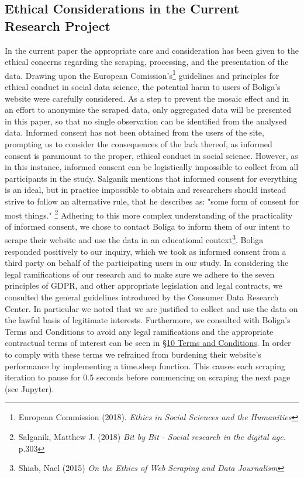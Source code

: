 \documentclass[12pt,a4paper]{article}
\begin{document}
\subsection{Ethical Considerations in the Current Research Project}
In the current paper the appropriate care and consideration has been given to the ethical concerns regarding the scraping, processing, and the presentation of the data. Drawing upon the European Comission's\footnote{European Commission (2018). \textit{Ethics in Social Sciences and the Humanities}} guidelines and principles for ethical conduct in social data science, the potential harm to users of Boliga's website were carefully considered. As a step to prevent the mosaic effect and in an effort to anonymise the scraped data, only aggregated data will be presented in this paper, so that no single observation can be identified from the analysed data.\newline
Informed consent has not been obtained from the users of the site, prompting us to consider the consequences of the lack thereof, as informed consent is paramount to the proper, ethical conduct in social science. However, as in this instance, informed consent can be logistically impossible to collect from all participants in the study. Salganik mentions that informed consent for everything is an ideal, but in practice impossible to obtain and researchers should instead strive to follow an alternative rule, that he describes as: "some form of consent for most things." \footnote{Salganik, Matthew J. (2018) \textit{Bit by Bit - Social research in the digital age.} p.303} Adhering to this more complex understanding of the practicality of informed consent, we chose to contact Boliga to inform them of our intent to scrape their website and use the data in an educational context\footnote{Shiab, Nael (2015) \textit{On the Ethics of Web Scraping and Data Journalism}}. Boliga responded positively to our inquiry, which we took as informed consent from a third party on behalf of the participating users in our study.\newline
In considering the legal ramifications of our research and to make sure we adhere to the seven principles of GDPR, and other appropriate legislation and legal contracts, we consulted the general guidelines introduced by the Consumer Data Research Center. In particular we noted that we are justified to collect and use the data on the lawful basis of legitimate interests. Furthermore, we consulted with Boliga's Terms and Conditions to avoid any legal ramifications and the appropriate contractual terms of interest can be seen in \href{https://www.boliga.dk/vilkaar-og-betingelser}{§10 Terms and Conditions}. In order to comply with these terms we refrained from burdening their website's performance by implementing a time.sleep function. This causes each scraping iteration to pause for 0.5 seconds before commencing on scraping the next page (see Jupyter). 
\end{document}

